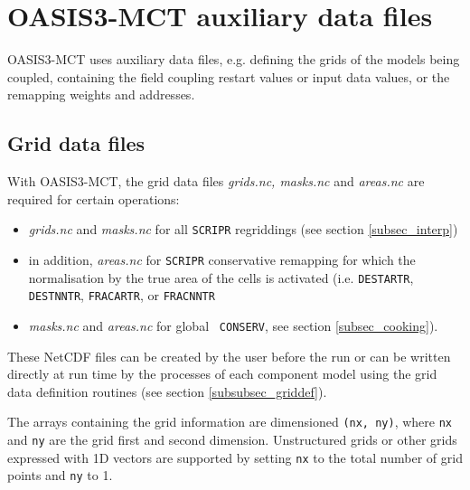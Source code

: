 \newpage
\chapter{OASIS3-MCT auxiliary data files}
\label{sec_auxiliary}

OASIS3-MCT uses auxiliary data files, e.g. defining the
grids of the models being coupled, containing the field coupling
restart values or input data values, or the remapping weights and
addresses.

\section{Grid data files}
\label{subsec_griddata}

With OASIS3-MCT, the grid data files {\em grids.nc, masks.nc} and {\em
  areas.nc} are required for certain operations:
\begin{itemize}
  \item{\em grids.nc} and {\em masks.nc} for all {\tt SCRIPR} regriddings (see
    section \ref{subsec_interp})
  \item in addition, {\em areas.nc} for {\tt SCRIPR} conservative remapping
for which the normalisation by the true area of the cells is 
activated (i.e. {\tt DESTARTR}, {\tt DESTNNTR}, {\tt FRACARTR}, or
{\tt FRACNNTR}
\item {\em masks.nc} and {\em areas.nc} for global {\tt
    CONSERV}, see section \ref{subsec_cooking}).
\end{itemize}

These NetCDF files can
be created by the user before the run or can be written directly at
run time by the processes of each component model using the grid
data definition routines (see section \ref{subsubsec_griddef}).

The arrays containing the grid information are dimensioned {\tt (nx,
  ny)}, where {\tt nx} and {\tt ny} are the grid first and second
dimension.  Unstructured grids or other grids expressed with 1D
vectors are supported by setting {\tt nx} to the total number of grid
points and {\tt ny} to 1.

